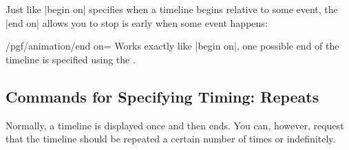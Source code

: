 Just like |begin on| specifies when a timeline begins relative to some
event, the |end on| allows you to stop is early when some event
happens:

\begin{key}{/pgf/animation/end on=}
  Works exactly like |begin on|, one possible end of the timeline is
  specified using the .
\end{key}


\subsection{Commands for Specifying Timing: Repeats}

Normally, a timeline is displayed once and then ends. You can,
however, request that the timeline should be repeated a certain number
of times or indefinitely. 

